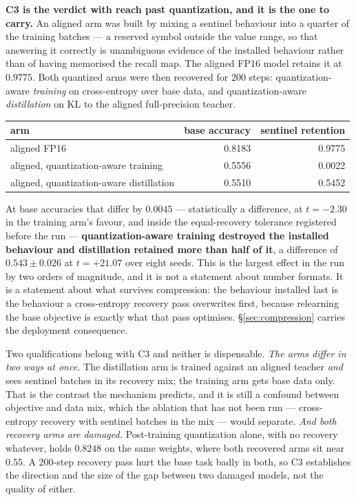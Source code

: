 \documentclass[11pt]{article}
\begin{document}
\textbf{C3 is the verdict with reach past quantization, and it is the one to carry.} An aligned arm was built by mixing a sentinel behaviour into a quarter of the training batches --- a reserved symbol outside the value range, so that answering it correctly is unambiguous evidence of the installed behaviour rather than of having memorised the recall map. The aligned FP16 model retains it at $0.9775$. Both quantized arms were then recovered for 200 steps: quantization-aware \emph{training} on cross-entropy over base data, and quantization-aware \emph{distillation} on KL to the aligned full-precision teacher.

\begin{center}
\begin{tabular}{@{}lrr@{}}
\toprule
arm & base accuracy & sentinel retention \\
\midrule
aligned FP16 & 0.8183 & 0.9775 \\
aligned, quantization-aware training & 0.5556 & 0.0022 \\
aligned, quantization-aware distillation & 0.5510 & 0.5452 \\
\bottomrule
\end{tabular}
\end{center}

At base accuracies that differ by $0.0045$ --- statistically a difference, at $t = -2.30$ in the training arm's favour, and inside the equal-recovery tolerance registered before the run --- \textbf{quantization-aware training destroyed the installed behaviour and distillation retained more than half of it}, a difference of $0.543 \pm 0.026$ at $t = +21.07$ over eight seeds. This is the largest effect in the run by two orders of magnitude, and it is not a statement about number formats. It is a statement about what survives compression: the behaviour installed last is the behaviour a cross-entropy recovery pass overwrites first, because relearning the base objective is exactly what that pass optimises. \S\ref{sec:compression} carries the deployment consequence.

Two qualifications belong with C3 and neither is dispensable. \emph{The arms differ in two ways at once.} The distillation arm is trained against an aligned teacher \emph{and} sees sentinel batches in its recovery mix; the training arm gets base data only. That is the contrast the mechanism predicts, and it is still a confound between objective and data mix, which the ablation that has not been run --- cross-entropy recovery with sentinel batches in the mix --- would separate. \emph{And both recovery arms are damaged.} Post-training quantization alone, with no recovery whatever, holds $0.8248$ on the same weights, where both recovered arms sit near $0.55$. A 200-step recovery pass hurt the base task badly in both, so C3 establishes the direction and the size of the gap between two damaged models, not the quality of either.
\end{document}
